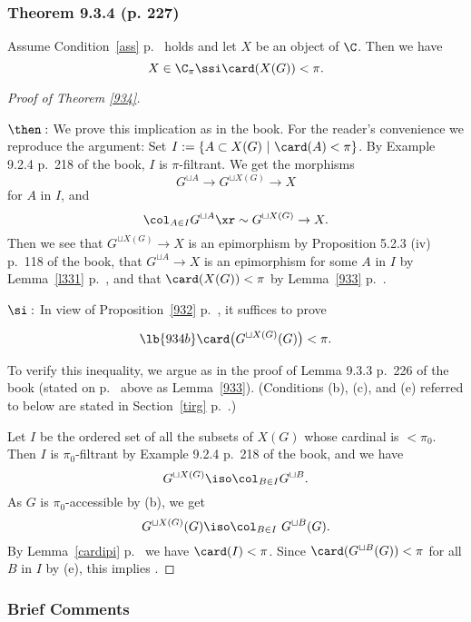 \documentclass[12pt]{article}
\theoremstyle{remark}
\theoremstyle{definition}
\begin{document}
\subsubsection{Theorem 9.3.4 (p. 227)}

\begin{thm}[Theorem 9.3.4 p.~227]
Assume Condition~\ref{ass} p.~ holds and let $X$ be an object of $\C$. Then we have 
$$
X\in\C_\pi\ssi\card(X(G))<\pi.
$$ 
\end{thm}

\begin{proof}[Proof of Theorem \ref{934}]${}$

\nn$\then:$ We prove this implication as in the book. For the reader's convenience we reproduce the argument: Set $I:=\{A\subset X(G)\ |\ \card(A)<\pi\}$. By Example 9.2.4 p.~218 of the book, $I$ is $\pi$-filtrant. We get the morphisms 
$$
G^{\sqcup A}\to G^{\sqcup X(G)}\to X
$$ 
for $A$ in $I$, and 
$$
\col_{A\in I}G^{\sqcup A}\xr\sim G^{\sqcup X(G)}\to X.
$$ 
Then we see that $G^{\sqcup X(G)}\to X$ is an epimorphism by Proposition 5.2.3 (iv) p.~118 of the book, that $G^{\sqcup A}\to X$ is an epimorphism for some $A$ in $I$ by Lemma~\ref{l331} p.~, and that $\card(X(G))<\pi$ by Lemma~\ref{933} p.~.

\nn$\si:$ In view of Proposition~\ref{932} p.~, it suffices to prove  

\begin{equation}\lb{934b}
\card\big(G^{\sqcup X(G)}(G)\big)<\pi.
\end{equation} 

To verify this inequality, we argue as in the proof of Lemma 9.3.3 p.~226 of the book (stated on p.~ above as Lemma~\ref{933}). (Conditions (b), (c), and (e) referred to below are stated in Section~\ref{tirg} p.~.)

Let $I$ be the ordered set of all the subsets of $X(G)$ whose cardinal is $<\pi_0$. Then $I$ is $\pi_0$-filtrant by Example 9.2.4 p.~218 of the book, and we have 
$$
G^{\sqcup X(G)}\iso\col_{B\in I}G^{\sqcup B}.
$$ 
As $G$ is $\pi_0$-accessible by (b), we get 
$$
G^{\sqcup X(G)}(G)\iso\col_{B\in I}\ G^{\sqcup B}(G).
$$ 
By Lemma~\ref{cardipi} p.~ we have $\card(I)<\pi$. Since $\card(G^{\sqcup B}(G))<\pi$ for all $B$ in $I$ by (e), this implies .
\end{proof}

\subsubsection{Brief Comments}
\end{document}
